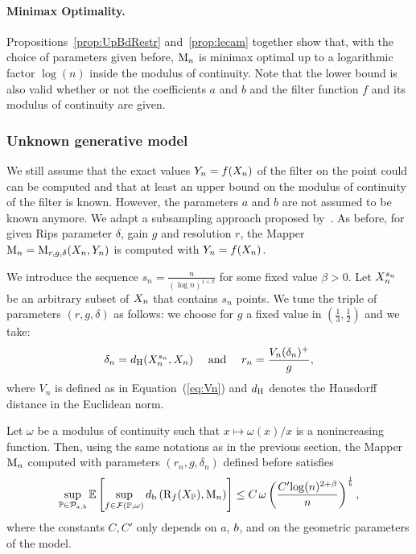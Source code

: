 \paragraph{Minimax Optimality.} Propositions~\ref{prop:UpBdRestr} and~\ref{prop:lecam} together show that, with the choice of parameters  given before, 
$\mathrm{M}_n$ is minimax optimal up to a logarithmic factor $\log(n)$ inside the modulus of continuity. Note that the 
lower bound is also valid whether or not the coefficients $a$ and $b$ and the filter function $f$ and its modulus of continuity are given.  


\subsubsection*{Unknown generative model}
\label{subsec:unknownab}

We still assume that the exact values $Y_n = f(X_n)$ of the filter on the point could can be computed and 
that at least an upper bound on the modulus of continuity of the filter is known. 
However, the parameters $a$ and $b$ are not assumed to be known anymore. We adapt a subsampling approach 
proposed by~\cite{Fasy14}. As before, for given Rips parameter $\delta$,  gain $g$ and resolution $r$, 
the Mapper $\mathrm{M}_n = \mathrm{M}_{r,g,\delta}(X_n,Y_n)$  is computed with $Y_n = f(X_n)$.

We introduce the sequence  $s_n =\frac n { (\log n)^{1+\beta}}$ for some fixed value $\beta > 0$. 
Let $ X_n^{s_n}$ be an arbitrary subset of $X_n$ that contains $s_n$ points. 
We tune the triple of parameters $(r,g,\delta)$ as follows: we choose for $g$ a fixed value in $\left(\frac13,\frac{1}{2}\right)$ and we take:
\begin{equation}
\label{ref:coeff_ab_inconnus}
\delta_n=d_{\rm H}(  X_n^{s_n},X_n)
\quad 
\textrm{ and }
\quad 
r_n=  \frac{V_n(\delta_n)^+} {g},
\end{equation}
where $V_n$ is defined as in Equation~(\ref{eq:Vn}) and $d_{\rm H}$ denotes the Hausdorff distance in the Euclidean norm.

\begin{prop}\label{prop:subs}
Let $\omega$ be a modulus of continuity such that 
$x\mapsto \omega(x)/x$ is a nonincreasing function. Then, using the same notations as in the previous section,  
the Mapper $\mathrm{M}_n$ computed with parameters $(r_n,g,\delta_n)$ defined before satisfies
\begin{equation*}
\sup_{\p \in \mathcal P_{a,b}} \mathbb{E}\left[   \sup_{f \in \mathcal F(\p,\omega) } \dper\left(\Reeb_f(\Xset_\p), \Map_n\right)\right]
\leq C\,\omega %
\left(\frac{C'{\log}(n)^{2+\beta}}{n}\right)^{\frac 1\dimension},%
\end{equation*}
where the constants $C,C'$ only depends on $a$, $b$, and on the geometric parameters of the model.
\end{prop}

